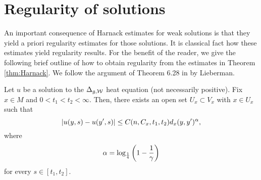\documentclass[a4paper, 12pt]{amsart}
\begin{document}
\section{Regularity of solutions}

An important consequence of Harnack estimates for weak 
solutions is that they yield a priori regularity estimates
for those solutions. It is classical fact how these estimates
yield regularity results. For the benefit of the reader, 
we give the following brief outline of how to obtain
regularity from the estimates in Theorem \ref{thm:Harnack}.
We follow the argument of Theorem 6.28 in 
\cite{Lieberman} by Lieberman.

\begin{prop}
Let $u$ be a solution to the $\Delta_{g,\mathcal{W}}$
heat equation (not necessarily positive).
Fix $x \in M$ and $0 < t_1 < t_2 < \infty$.
Then, there exists an open set $U_x \subset V_x$ 
with $x \in U_x$
such that 
$$ |u(y,s) - u(y',s)| \leq C(n, C_x, t_1, t_2) d_x(y, y')^\alpha,$$
where 
$$ \alpha = \log_{\frac{1}{4}}\left(1 - \frac{1}{\gamma}\right)$$
for every $s \in [t_1, t_2]$.
\end{prop}
\end{document}
